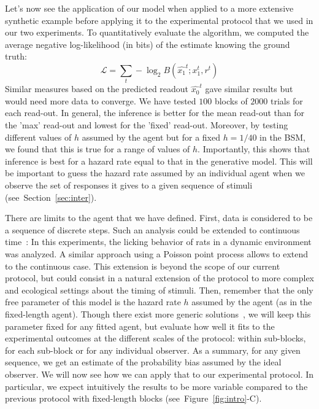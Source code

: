 \documentclass[12pt,english]{article}%
\newcommand{\eql}[1]{\begin{equation}#1\end{equation}}
\newcommand{\Ll}{\mathcal{L}}
\newcommand{\citep}[1]{\parencite{#1}}
\newcommand{\seeFig}[1]{Figure~\ref{fig:#1}}
\newcommand{\seeSec}[1]{Section~\ref{sec:#1}}
\begin{document}
Let's now see the application of our model when applied
to a more extensive synthetic example before applying it to the experimental protocol 
that we used in our two experiments.
To quantitatively evaluate the algorithm, 
we computed the average negative log-likelihood (in bits) of the estimate 
knowing the ground truth:
\eql{
\Ll =  \sum_{t} -\log_2 B(\hat{x_1}^t ; x_1^t, r^t )
}
Similar measures based on the predicted readout $\hat{x_0}^t$ 
gave similar results but would need more data to converge.
We have tested $100$ blocks of $2000$ trials for each read-out.
In general, the inference is better for the mean read-out 
than for the 'max' read-out and lowest for the 'fixed' read-out. 
Moreover, by testing different values of $h$ assumed by the agent
but for a fixed $h=1/40$ in the BSM,
we found that this is true for a range of values of $h$. 
Importantly, this shows that inference is best for a hazard rate 
equal to that in the generative model.
This will be important to guess the hazard rate assumed by an individual agent
when we observe the set of responses it gives to a given sequence of stimuli
(see~\seeSec{inter}).

There are limits to the agent that we have defined. 
First, data is considered to be a sequence of discrete steps.
Such an analysis could be extended to continuous time~\citep{RadilloBrady2017}:
In this experiments, the licking behavior of rats in a dynamic environment
was analyzed.
A similar approach using a Poisson point process allows to extend to the continuous case.
This extension is beyond the scope of our current protocol,
but could consist in a natural extension of the protocol 
to more complex and ecological settings about the timing of stimuli.
Then, remember that the only free parameter of this model is the hazard rate $h$ 
assumed by the agent (as in the fixed-length agent).
Though there exist more generic solutions~\citep{Wilson13,Wilson18},
we will keep this parameter fixed for any fitted agent, but evaluate 
how well it fits to the experimental outcomes at the different scales of the protocol:
within sub-blocks, for each sub-block or for any individual observer. 
As a summary, for any given sequence,
we get an estimate of the probability bias assumed  by the ideal observer.
We will now see how we can apply that to our experimental protocol.
In particular, we expect intuitively the results to be more variable
compared to the previous protocol with fixed-length blocks (see~\seeFig{intro}-C).
\end{document}
